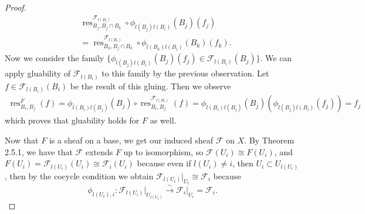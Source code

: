 \documentclass{article}
\newcommand{\fF}{\mathscr{F}}
\DeclareMathOperator{\res}{\mathrm{res}}
\begin{document}
\begin{proof}
         \begin{align*}
             & \res_{B_j,B_j\cap B_k}^{\fF_{l(B_i)}}\circ\phi_{l(B_j)l(B_i)}(B_j)(f_j)\\
            &= \res_{B_k,B_j\cap B_k}^{\fF_{l(B_i)}}\circ \phi_{l(B_k)l(B_i)}(B_k)(f_k).
         \end{align*}
    Now we consider the family $\{\phi_{l(B_j)l(B_i)}(B_j)(f_j)\in \fF_{l(B_i)}(B_j)\}$. We can apply gluability of $\fF_{l(B_i)}$ to this family by the previous observation. Let $f\in \fF_{l(B_i)}(B_i)$ be the result of this gluing. Then we observe
    \begin{align*}
        \res_{B_i,B_j}^F(f)=\phi_{l(B_i)l(B_j)}(B_j)\circ \res_{B_i,B_j}^{\fF_{l(B_i)}}(f)=\phi_{l(B_i)l(B_j)}(B_j)(\phi_{l(B_j)l(B_i)}(f_j))=f_j
    \end{align*}
    which proves that gluability holds for $F$ as well.

    \vspace{0.1in}
    Now that $F$ is a sheaf on a base, we get our induced sheaf $\fF$ on $X$. By Theorem 2.5.1, we have that $\fF$ extends $F$ up to isomorphism, so $\fF(U_i)\cong F(U_i)$, and $F(U_i)=\fF_{l(U_i)}(U_i)\cong \fF_i(U_i)$ because even if $l(U_i)\ne i$, then $U_i\subset U_{l(U_i)}$, then by the cocycle condition we obtain $\fF_{l(U_i)}\vert_{U_i}\cong \fF_i$ because
    \[
    \phi_{l(U_i),i}:\fF_{l(U_i)}\vert_{U_{l(U_i)}} \xrightarrow{\sim} \fF_i\vert_{U_i}=\fF_i.
    \]
\end{proof}
\subsection{}
\end{document}
